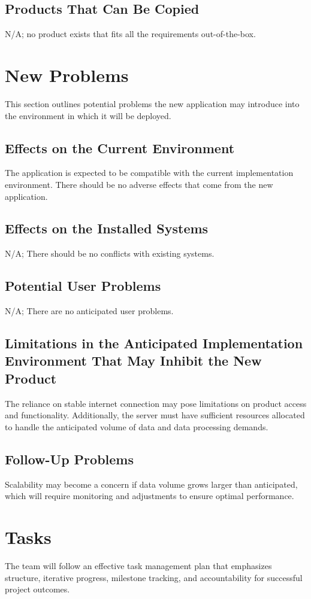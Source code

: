 \documentclass[12pt]{article}
\begin{document}
\subsection{Products That Can Be Copied}
N/A; no product exists that fits all the requirements out-of-the-box.


\section{New Problems}
This section outlines potential problems the new application may introduce into the  environment in which it will be deployed.
\subsection{Effects on the Current Environment}
The application is expected to be compatible with the current implementation environment. There should be no adverse effects that come from the new application.

\subsection{Effects on the Installed Systems}
N/A; There should be no conflicts with existing systems.

\subsection{Potential User Problems}
N/A; There are no anticipated user problems.

\subsection{Limitations in the Anticipated Implementation Environment That May
Inhibit the New Product}
The reliance on stable internet connection may pose limitations on product access and functionality. Additionally, the server must have sufficient resources allocated to handle the anticipated volume of data and data processing demands.

\subsection{Follow-Up Problems}
Scalability may become a concern if data volume grows larger than anticipated, which will require monitoring and adjustments to ensure optimal performance.

\section{Tasks}
The team will follow an effective task management plan that emphasizes
structure, iterative progress, milestone tracking, and accountability for
successful project outcomes. 
\end{document}
